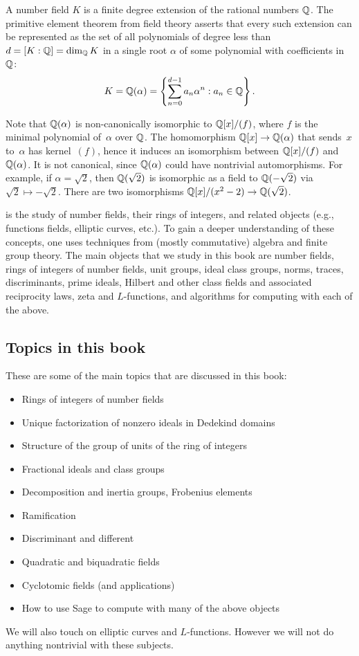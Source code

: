 A number field $K$ is a finite degree extension of the rational
numbers $\mathbb{Q}$.  The primitive element theorem from field theory
asserts that every such extension can be represented as the set of all
polynomials of degree less than $d = [K:\mathbb{Q}] = \dim_{\mathbb{Q}} K$ in
a single root $\alpha$ of some polynomial with coefficients in $\mathbb{Q}$:
$$
 K = \mathbb{Q}(\alpha) = \left\{ \sum_{n=0}^{d-1} a_n \alpha^n : a_n\in\mathbb{Q} \right\}.
$$

Note that
$\mathbb{Q}(\alpha)$ is non-canonically isomorphic to $\mathbb{Q}[x]/(f)$, where $f$
is the minimal polynomial of~$\alpha$ over $\mathbb{Q}$.
The homomorphism $\mathbb{Q}[x]\to\mathbb{Q}(\alpha)$ that sends~$x$ to~$\alpha$
has kernel~$(f)$, hence it induces an isomorphism between
$\mathbb{Q}[x]/(f)$ and $\mathbb{Q}(\alpha)$.
It is not canonical, since $\mathbb{Q}(\alpha)$ could
have nontrivial automorphisms.  For example, if $\alpha=\sqrt{2}$, then
$\mathbb{Q}(\sqrt{2})$ is isomorphic as a field to $\mathbb{Q}(-\sqrt{2})$ via
$\sqrt{2}\mapsto -\sqrt{2}$.  There are two isomorphisms
$\mathbb{Q}[x]/(x^2-2)\to \mathbb{Q}(\sqrt{2})$.


 is the study of number fields, their rings of
integers, and related objects (e.g., functions fields, elliptic curves, etc.).
To gain a deeper understanding of these concepts, one uses techniques from
(mostly commutative) algebra and finite group theory.
The main objects that we study in this book are number fields, rings of
integers of number fields, unit groups, ideal class groups, norms, traces,
discriminants, prime ideals, Hilbert and other class fields and
associated reciprocity laws, zeta and $L$-functions, and algorithms
for computing with each of the above.

\subsection{Topics in this book}
These are some of the main topics that are discussed in this book:
\begin{itemize}\setlength{\itemsep}{-.7ex}
	\item Rings of integers of number fields
	\item Unique factorization of nonzero ideals in Dedekind domains
	\item Structure of the group of units of the ring of integers
	\item Fractional ideals and class groups
	\item Decomposition and inertia groups, Frobenius elements
	\item Ramification
	\item Discriminant and different
	\item Quadratic and biquadratic fields
	\item Cyclotomic fields (and applications)
	\item How to use Sage to compute with many of the above objects
\end{itemize}
We will also touch on elliptic curves and $L$-functions.
However we will not do anything nontrivial with these subjects.


